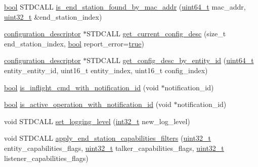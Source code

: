 \begin{DoxyCompactItemize}
\hyperlink{avb__gptp_8h_af6a258d8f3ee5206d682d799316314b1}{bool} S\+T\+D\+C\+A\+LL \hyperlink{classavdecc__lib_1_1controller__imp_ace1a04cce5b1ac3fd3a6e9fc4fc89467}{is\+\_\+end\+\_\+station\+\_\+found\+\_\+by\+\_\+mac\+\_\+addr} (\hyperlink{parse_8c_aec6fcb673ff035718c238c8c9d544c47}{uint64\+\_\+t} mac\+\_\+addr, \hyperlink{parse_8c_a6eb1e68cc391dd753bc8ce896dbb8315}{uint32\+\_\+t} \&end\+\_\+station\+\_\+index)
\item 
\hyperlink{classavdecc__lib_1_1configuration__descriptor}{configuration\+\_\+descriptor} $\ast$S\+T\+D\+C\+A\+LL \hyperlink{classavdecc__lib_1_1controller__imp_ac31ce15c7d3f61a12c0ca5da473e0445}{get\+\_\+current\+\_\+config\+\_\+desc} (size\+\_\+t end\+\_\+station\+\_\+index, \hyperlink{avb__gptp_8h_af6a258d8f3ee5206d682d799316314b1}{bool} report\+\_\+error=\hyperlink{avb__gptp_8h_af6a258d8f3ee5206d682d799316314b1a08f175a5505a10b9ed657defeb050e4b}{true})
\item 
\hyperlink{classavdecc__lib_1_1configuration__descriptor}{configuration\+\_\+descriptor} $\ast$S\+T\+D\+C\+A\+LL \hyperlink{classavdecc__lib_1_1controller__imp_a3a047231270aae57bc2f03a12e8e24a7}{get\+\_\+config\+\_\+desc\+\_\+by\+\_\+entity\+\_\+id} (\hyperlink{parse_8c_aec6fcb673ff035718c238c8c9d544c47}{uint64\+\_\+t} entity\+\_\+entity\+\_\+id, uint16\+\_\+t entity\+\_\+index, uint16\+\_\+t config\+\_\+index)
\item 
\hyperlink{avb__gptp_8h_af6a258d8f3ee5206d682d799316314b1}{bool} \hyperlink{classavdecc__lib_1_1controller__imp_aa5c3cd6eac3ef43eb32c176106a182e6}{is\+\_\+inflight\+\_\+cmd\+\_\+with\+\_\+notification\+\_\+id} (void $\ast$notification\+\_\+id)
\item 
\hyperlink{avb__gptp_8h_af6a258d8f3ee5206d682d799316314b1}{bool} \hyperlink{classavdecc__lib_1_1controller__imp_a478e43b65aafe1a0e927e84304047003}{is\+\_\+active\+\_\+operation\+\_\+with\+\_\+notification\+\_\+id} (void $\ast$notification\+\_\+id)
\item 
void S\+T\+D\+C\+A\+LL \hyperlink{classavdecc__lib_1_1controller__imp_a82fb1d8fd7562a16ef06c31f867abdd8}{set\+\_\+logging\+\_\+level} (\hyperlink{parse_8c_a37994e3b11c72957c6f454c6ec96d43d}{int32\+\_\+t} new\+\_\+log\+\_\+level)
\item 
void S\+T\+D\+C\+A\+LL \hyperlink{classavdecc__lib_1_1controller__imp_a61abde749cb7a126da1dd75b6cf84a9c}{apply\+\_\+end\+\_\+station\+\_\+capabilities\+\_\+filters} (\hyperlink{parse_8c_a6eb1e68cc391dd753bc8ce896dbb8315}{uint32\+\_\+t} entity\+\_\+capabilities\+\_\+flags, \hyperlink{parse_8c_a6eb1e68cc391dd753bc8ce896dbb8315}{uint32\+\_\+t} talker\+\_\+capabilities\+\_\+flags, \hyperlink{parse_8c_a6eb1e68cc391dd753bc8ce896dbb8315}{uint32\+\_\+t} listener\+\_\+capabilities\+\_\+flags)

\end{DoxyCompactItemize}
